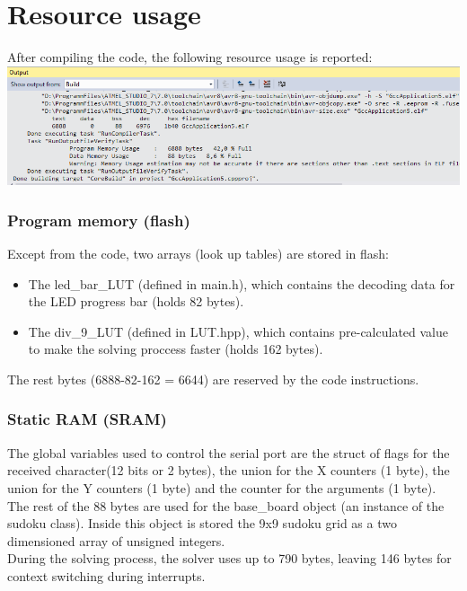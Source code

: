 \documentclass[12pt, a4, hidelinks]{article}
\begin{document}
\section*{Resource usage}
After compiling the code, the following resource usage is reported: \\
\includegraphics[width = \textwidth]{RESOURCES.png} 

\subsubsection*{Program memory (flash)}
Except from the code, two arrays (look up tables) are stored in flash: 
\begin{itemize}
\item The led\_bar\_LUT (defined in main.h), which contains the decoding data for the LED progress bar (holds 82 bytes).
\item The div\_9\_LUT (defined in LUT.hpp), which contains pre-calculated value to make the solving proccess faster (holds 162 bytes).
\end{itemize}
The rest bytes (6888-82-162 = 6644) are reserved by the code instructions.

\subsubsection*{Static RAM (SRAM)}
The global variables used to control the serial port are the struct of flags for the received character(12 bits or 2 bytes), the union for the X counters (1 byte), the union for the Y counters (1 byte) and the counter for the arguments (1 byte). The rest of the 88 bytes are used for the base\_board object (an instance of the sudoku class). Inside this object is stored the 9x9 sudoku grid as a two dimensioned array of unsigned integers. \\
During the solving process, the solver uses up to 790 bytes, leaving 146 bytes for context switching during interrupts.
\end{document}
